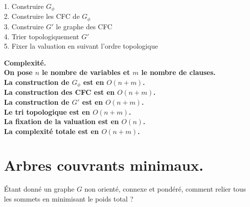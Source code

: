 \documentclass[french, 11pt]{article}
\begin{document}
\vspace*{-0.4cm}

\begin{thm}{}{}
    \begin{algorithm}[H]
        \caption{Algorithme de satisfiabilité}
        1. Construire $G_\phi$\\
        2. Construire les CFC de $G_\phi$\\
        3. Construire $G'$ le graphe des CFC\\
        4. Trier topologiquement $G'$\\
        5. Fixer la valuation en suivant l'ordre topologique\\
    \end{algorithm}
    \bf{Complexité.}\\
    On pose $n$ le nombre de variables et $m$ le nombre de clauses.\\
    La construction de $G_\phi$ est en $O(n+m)$.\\
    La construction des CFC est en $O(n+m)$.\\
    La construction de $G'$ est en $O(n+m)$.\\
    Le tri topologique est en $O(n+m)$.\\
    La fixation de la valuation est en $O(n)$.\\
    La complexité totale est en $O(n+m)$.
\end{thm}

\section{Arbres couvrants minimaux.}

\begin{defi}{}{}
    Étant donné un graphe $G$ non orienté, connexe et pondéré, comment relier tous les sommets en minimisant le poids total ?
\end{defi}

\vspace*{-0.4cm}
\end{document}
